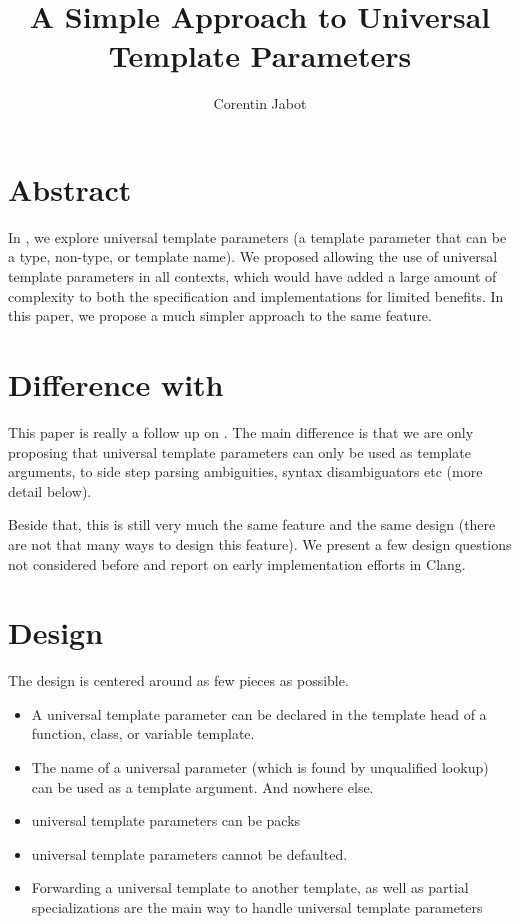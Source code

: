 \documentclass{wg21}
\title{A Simple Approach to Universal Template Parameters}
\author{Corentin Jabot}{corentin.jabot@gmail.com}
\begin{document}
\maketitle

\section{Abstract}
In , we explore universal template parameters (a template parameter that can be a type, non-type, or template name).
We proposed allowing the use of universal template parameters in all contexts, which would have added a large amount of complexity to both the specification and implementations
for limited benefits. In this paper, we propose a much simpler approach to the same feature.

\section{Difference with }

This paper is really a follow up on .
The main difference is that we are only proposing that universal template parameters can only be used as template arguments, to side step parsing ambiguities, syntax disambiguators etc
(more detail below).

Beside that, this is still very much the same feature and the same design (there are not that many ways to design this feature).
We present a few design questions not considered before and report on early implementation efforts in Clang.


\section{Design}

The design is centered around as few pieces as possible.
\begin{itemize}
\item A universal template parameter can be declared in the template head of a function, class, or variable template.
\item The name of a universal parameter (which is found by unqualified lookup) can be used as a template argument. And nowhere else.
\item universal template parameters can be packs
\item universal template parameters cannot be defaulted.
\item Forwarding a universal template to another template, as well as partial specializations are the main way to handle universal template parameters
\end{itemize}
\end{document}
